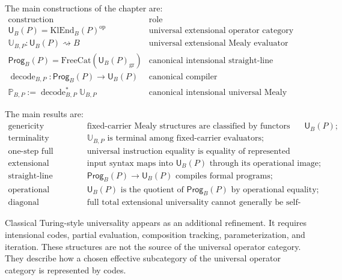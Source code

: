 The main constructions of the chapter are:
\[
\begin{array}{c|c}
\text{construction} & \text{role} \\ \hline
\mathsf U_B(P)=\mathrm{KlEnd}_B(P)^{\operatorname{op}}
    & \text{universal extensional operator category} \\
\mathbb U_{B,P}:\mathsf U_B(P)\rightsquigarrow B
    & \text{universal extensional Mealy evaluator} \\
\mathsf{Prog}_B(P)=\mathrm{FreeCat}(\mathsf U_B(P)_{\mathrm{gr}})
    & \text{canonical intensional straight-line program category} \\
\operatorname{decode}_{B,P}:\mathsf{Prog}_B(P)\to\mathsf U_B(P)
    & \text{canonical compiler} \\
\mathbb P_{B,P}:=\operatorname{decode}_{B,P}^{\ast}\mathbb U_{B,P}
    & \text{canonical intensional universal Mealy program machine.}
\end{array}
\]

The main results are:
\[
\begin{array}{c|l}
\text{genericity} &
\text{fixed-carrier Mealy structures are classified by functors into }\mathsf U_B(P);\\
\text{terminality} &
\mathbb U_{B,P}\text{ is terminal among fixed-carrier evaluators;}\\
\text{one-step full abstraction} &
\text{universal instruction equality is equality of represented carrier effect;}\\
\text{extensional collapse} &
\text{input syntax maps into }\mathsf U_B(P)\text{ through its operational image;}\\
\text{straight-line compilation} &
\mathsf{Prog}_B(P)\to\mathsf U_B(P)\text{ compiles formal programs;}\\
\text{operational quotient} &
\mathsf U_B(P)\text{ is the quotient of }\mathsf{Prog}_B(P)\text{ by operational equality;}\\
\text{diagonal obstruction} &
\text{full total extensional universality cannot generally be self-coded.}
\end{array}
\]

Classical Turing-style universality appears as an additional refinement.  It requires intensional
codes, partial evaluation, composition tracking, parameterization, and iteration.  These structures
are not the source of the universal operator category.  They describe how a chosen effective
subcategory of the universal operator category is represented by codes.

